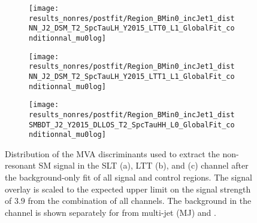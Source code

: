 \begin{figure}[htbp]
  \centering

  \begin{subfigure}{0.495\textwidth}
    \centering

    \texttt{[image: results\_nonres/postfit/Region\_BMin0\_incJet1\_distNN\_J2\_DSM\_T2\_SpcTauLH\_Y2015\_LTT0\_L1\_GlobalFit\_conditionnal\_mu0log]}

  \end{subfigure}\hfill%
  \begin{subfigure}{0.495\textwidth}
    \centering

    \texttt{[image: results\_nonres/postfit/Region\_BMin0\_incJet1\_distNN\_J2\_DSM\_T2\_SpcTauLH\_Y2015\_LTT1\_L1\_GlobalFit\_conditionnal\_mu0log]}

  \end{subfigure}

  \vspace{0.5em}

  \begin{subfigure}{0.495\textwidth}
    \centering

    \texttt{[image: results\_nonres/postfit/Region\_BMin0\_incJet1\_distSMBDT\_J2\_Y2015\_DLLOS\_T2\_SpcTauHH\_L0\_GlobalFit\_conditionnal\_mu0log]}

  \end{subfigure}

  \caption{Distribution of the MVA discriminants used to extract the
    non-resonant SM \HH signal in the \lephad SLT (a), \lephad LTT
    (b), and \hadhad (c) channel after the background-only fit of all
    signal and control regions. The signal overlay is scaled to the
    expected upper limit on the signal strength of $3.9$ from the
    combination of all channels. The \faketauhadvis background in the
    \hadhad channel is shown separately for \faketauhadvis from
    multi-jet (MJ) and \ttbar.}%
  \label{fig:mvascores_postfit}
\end{figure}

